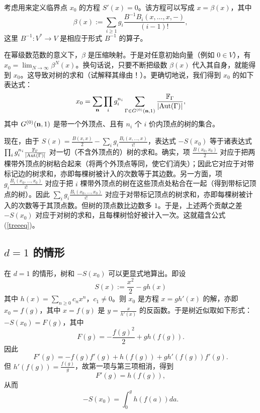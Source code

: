 考虑用来定义临界点 $x_0$ 的方程 $S'(x)=0$。该方程可以写成 $x=\beta(x)$，其中
$$
\beta(x):=\sum_{i\ge 1}g_i\frac{B^{-1}B_i(x, \ldots ,x,-)}{(i-1)!},
$$
这里 $B^{-1}: V^*\to V$ 是相应于形式 $B^{-1}$ 的算子。

在幂级数范数的意义下，$\beta$ 是压缩映射。于是对任意初始向量（例如 $0\in V$），有 $x_0=\lim_{N\to \infty}\beta^N(x)$。换句话说，只要不断把级数 $\beta(x)$ 代入其自身，就能得到 $x_0$。这导致对树的求和（试解释其缘由！）。更确切地说，我们得到 $x_0$ 的如下表达式：
$$
x_0=\sum_{\bold n}\prod_i g_i^{n_i}\sum_{\Gamma\in G^{(0)}(\bold n,1)}
\frac{\Bbb F_\Gamma}{|{\rm Aut}(\Gamma)|},
$$
其中 $G^{(0)}(\bold n,1)$ 是带一个外顶点、且有 $n_i$ 个 $i$ 价内顶点的树的集合。

现在，由于 $S(x)=\frac{B(x,x)}{2}-\sum_i g_i\frac{B_i(x, \ldots ,x)}{i!}$，表达式 $-S(x_0)$ 等于诸表达式 $\prod_i g_i^{n_i}\frac{\Bbb F_\Gamma}{|{\rm Aut}(\Gamma)|}$ 对一切（不含外顶点的）树的求和。确实，项 $\frac{B(x_0,x_0)}{2}$ 对应于把两棵带外顶点的树粘合起来（将两个外顶点等同，使它们消失）；因此它对应于对带标记边的树求和，亦即每棵树被计入的次数等于其边数。另一方面，项 $g_i\frac{B_i(x_0, \ldots ,x_0)}{i!}$ 对应于把 $i$ 棵带外顶点的树在这些顶点处粘合在一起（得到带标记顶点的树）。因此 $\sum_i g_i\frac{B_i(x_0, \ldots ,x_0)}{i!}$ 对应于对带标记顶点的树求和，亦即每棵树被计入的次数等于其顶点数。但树的顶点数比边数多 $1$。于是，上述两个贡献之差 $-S(x_0)$ 对应于对树的求和，且每棵树恰好被计入一次。这就蕴含公式 (\ref{treeeq})。


\subsection{$d=1$ 的情形}

在 $d=1$ 的情形，树和 $-S(x_0)$ 可以更显式地算出。即设
$$
S(x):=\frac{x^2}{2}-gh(x)
$$
其中 $h(x)=\sum_{n\ge 0}c_nx^n$，$c_1\ne 0$。则 $x_0$ 是方程 $x=gh'(x)$ 的解，亦即 $x_0=f(g)$，其中 $x=f(y)$ 是 $y=\frac{x}{h'(x)}$ 的反函数。于是树近似取如下形式：$-S(x_0)=F(g)$，其中
$$
F(g)=-\frac{f(g)^2}{2}+gh(f(g)). 
$$
因此
$$
F'(g)=-f(g)f'(g)+h(f(g))+gh'(f(g))f'(g).
$$
但 $h'(f(g))=\frac{f(g)}{g}$，故第一项与第三项相消，得到
$$
F'(g)=h(f(g)), 
$$
从而
\begin{equation}\label{deq1}
-S(x_0)=\int_0^g h(f(a))da.
\end{equation}

